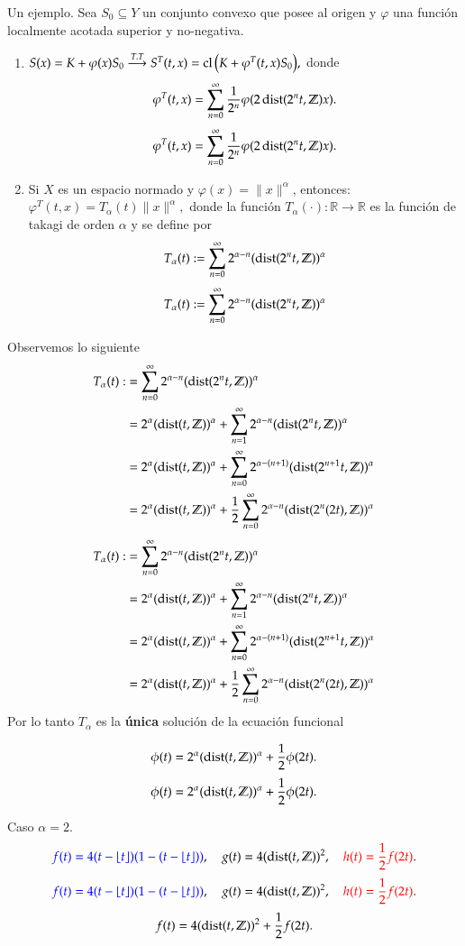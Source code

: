 \documentclass[notheorems,envcountsect,serif,mathserif,professionalfonts,spanish,10pt]{beamer}
\newcommand{\R}{\mathbb{R}}
\newcommand{\Z}{\mathbb{Z}}
\newcommand{\dist}{\mathop{\hbox{\rm dist}}\nolimits}
\newcommand{\cl}{\mathop{\hbox{\rm cl}}\nolimits}
\theoremstyle{definition}
\def\Eq#1#2{\ifthenelse{\equal{#1}{*}}
  {\begin{equation*}\begin{aligned}[]#2\end{aligned}\end{equation*}}
  {\begin{equation}\begin{aligned}[]\label{E#1}#2\end{aligned}\end{equation}}}
\begin{document}
\begin{frame}
\begin{block}{Un ejemplo.}
Sea $S_0\subseteq Y$ un conjunto convexo que posee al origen y $\varphi$
una función localmente acotada superior y no-negativa.
\begin{enumerate}
\item $S(x) = K + \varphi(x)S_0 \stackrel{T.T}{\longrightarrow} 
	       S^T(t,x) = \cl\Big(K+\varphi^T(t,x)S_0\Big),$ donde
\Eq{*}{
\varphi^T(t,x) =\sum_{n=0}^\infty\frac1{2^n}\varphi(2\dist(2^nt,\Z)x).
}	
\item Si $X$ es un espacio normado y $\varphi(x) = \|x\|^\alpha$, entonces:
$%
\varphi^T(t,x)=T_\alpha(t)\|x\|^\alpha,
$%
donde la función $T_\alpha(\cdot):\R\to\R$ es la 
función de takagi de orden $\alpha$ y se define por
\Eq{a-tak}{
T_\alpha(t):=\sum_{n=0}^\infty2^{\alpha-n}(\dist(2^nt,\Z))^\alpha
}
\end{enumerate}
\end{block}
\end{frame}

\begin{frame}
	Observemos lo siguiente
	\Eq{a-tak}{
	T_\alpha(t):&=\sum_{n=0}^\infty2^{\alpha-n}(\dist(2^nt,\Z))^\alpha \\
	            &=2^{\alpha}(\dist(t,\Z))^\alpha+\sum_{n=1}^\infty2^{\alpha-n}(\dist(2^nt,\Z))^\alpha\\
							&=2^{\alpha}(\dist(t,\Z))^\alpha+\sum_{n=0}^\infty2^{\alpha-(n+1)}(\dist(2^{n+1}t,\Z))^\alpha\\
							&=2^{\alpha}(\dist(t,\Z))^\alpha+\frac12\sum_{n=0}^\infty2^{\alpha-n}(\dist(2^n(2t),\Z))^\alpha
	}
	Por lo tanto $T_\alpha$ es la \textbf{única} solución de la ecuación funcional
	\begin{block}{}
	\Eq{*}{
	\phi(t) = 2^{\alpha}(\dist(t,\Z))^\alpha+\frac12\phi(2t).
	}
	\end{block}
\end{frame}

\begin{frame}{Caso $\alpha=2$.}
\vspace{-.6cm}
\Eq{*}{
\textcolor{blue}{f(t)=4(t-\lfloor t\rfloor)(1-(t-\lfloor t\rfloor))},\quad
\textcolor{black}{g(t)=4(\dist(t,\Z))^2},\quad
\textcolor{red}{h(t)=\frac12f(2t)}.
}
$$f(t) = 4(\dist(t,\Z))^2+\frac12f(2t).$$

\vspace{-.5cm}
	\begin{figure}[h]
		
			
	\end{figure}
\end{frame}
\end{document}
